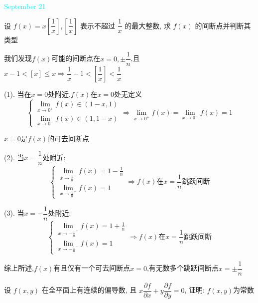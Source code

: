 \textcolor{cyan}{September 21}

\begin{example}[][Exam: 35.3.13]
	设 $f(x)=x[\dfrac{1}{x}], [\dfrac{1}{x}]$ 表示不超过 $\dfrac{1}{x}$ 的最大整数, 求 $f(x)$ 的间断点并判断其类型
\end{example}

\begin{solution}

	我们发现$f(x)$可能的间断点在$x=0,\pm \dfrac{1}{n}$,且$x-1<[x]\leq x\Rightarrow \dfrac{1}{x}-1<[\dfrac{1}{x}]<\dfrac{1}{x}$
	
	(1). 当在$x=0$处附近,$f(x)$在$x=0$处无定义
	$$\left\lbrace
	\begin{array}{l}
		\lim\limits_{x\to 0^{+}}f(x)\in(1-x,1)\\
		\lim\limits_{x\to 0^{-}}f(x)\in(1,1-x)
	\end{array}
	\right. \Rightarrow \lim\limits_{x\to 0^{+}}f(x)=\lim\limits_{x\to 0^{-}}f(x)=1$$
	
	$x=0$是$f(x)$的可去间断点
	
	(2). 当$x=\dfrac{1}{n}$处附近:  
	$$\left\lbrace
	\begin{array}{l}
		\lim\limits_{x\to \frac{1}{n}^{+}}f(x)=1-\frac{1}{n}\\
		\lim\limits_{x\to \frac{1}{n}^{-}}f(x)=1
	\end{array}
	\right. \Rightarrow f(x)\text{在}x=\dfrac{1}{n}\text{跳跃间断}$$
	
	(3). 当$x=-\dfrac{1}{n}$处附近:  
	$$\left\lbrace
	\begin{array}{l}
		\lim\limits_{x\to -\frac{1}{n}^{+}}f(x)=1+\frac{1}{n}\\
		\lim\limits_{x\to -\frac{1}{n}^{-}}f(x)=1
	\end{array}
	\right. \Rightarrow f(x)\text{在}x=\dfrac{1}{n}\text{跳跃间断}$$
	
	综上所述,$f(x)$有且仅有一个可去间断点$x=0$,有无数多个跳跃间断点$x=\pm \dfrac{1}{n}$
\end{solution}

\begin{example}[][Exam: 35.3.14]
	设 $f(x,y)$ 在全平面上有连续的偏导数, 且 $x\dfrac{\partial f}{\partial x}+y\dfrac{\partial f}{\partial y}=0$, 证明: $f(x,y)$为常数
\end{example}

